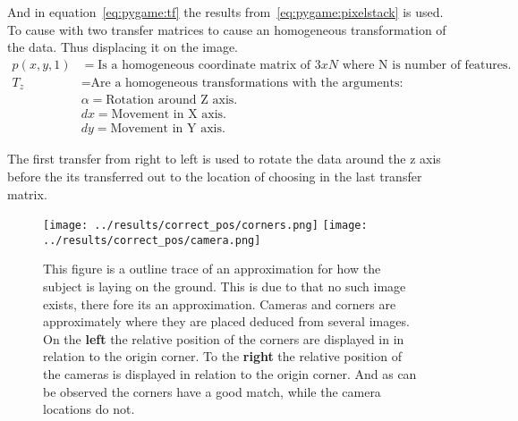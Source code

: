And in equation~\ref{eq:pygame:tf} the results from~\ref{eq:pygame:pixelstack} is used.
To cause with two transfer matrices to cause an homogeneous transformation of the data.
Thus displacing it on the image.
\begin{align*}
    p(x,y,1) &=  \text{Is a homogeneous coordinate matrix of $3xN$ where N is number of features.}\\
    T_{z}    &=  \text{Are a homogeneous transformations with the arguments:}\\
             & \alpha  = \text{Rotation around Z axis.}\\
             & dx =      \text{Movement in X axis.}\\
             & dy =      \text{Movement in Y axis.}
\end{align*}

The first transfer from right to left is used to rotate the data around the z axis before the its transferred out to the location of choosing in the last transfer matrix.



\begin{figure}
\begin{center}
    \texttt{[image: ../results/correct\_pos/corners.png]}
    \hspace{1cm}
    \texttt{[image: ../results/correct\_pos/camera.png]}
\end{center}
\caption[Approx locations of markers and cameras]{This figure is a outline trace of an approximation for how the subject is laying on the ground.
    This is due to that no such image exists, there fore its an approximation.
    Cameras and corners are approximately where they are placed deduced from several images.
    On the \textbf{left} the relative position of the \aruco{ } corners are displayed in in relation to the origin corner.
    To the \textbf{right} the relative position of the cameras is displayed in relation to the \aruco{ } origin corner.
And as can be observed the corners have a good match, while the camera locations do not.}
\label{fig:correct_pose}
\end{figure}


